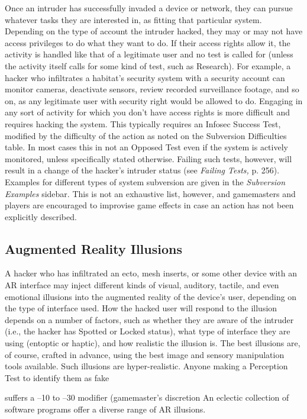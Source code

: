 Once an intruder has successfully invaded a device or network, they can pursue whatever tasks they are interested in, as fitting that particular system. Depending on the type of account the intruder hacked, they may or may not have access privileges to do what they want to do. If their access rights allow it, the activity is handled like that of a legitimate user and no test is called for (unless the activity itself calls for some kind of test, such as Research). For example, a hacker who infiltrates a habitat's security system with a security account can monitor cameras, deactivate sensors, review recorded surveillance footage, and so on, as any legitimate user with security right would be allowed to do. Engaging in any sort of activity for which you don't have access rights is more difficult and requires hacking the system. This typically requires an Infosec Success Test, modified by the difficulty of the action as noted on the Subversion Difficulties table. In most cases this in not an Opposed Test even if the system is actively monitored, unless specifically stated otherwise. Failing such tests, however, will result in a change of the hacker's intruder status (see \textit{Failing Tests,} p. 256). Examples for different types of system subversion are given in the \textit{Subversion Examples} sidebar. This is not an exhaustive list, however, and gamemasters and players are encouraged to improvise game effects in case an action has not been explicitly described. 

\subsection{Augmented Reality Illusions} 

A hacker who has infiltrated an ecto, mesh inserts, or some other device with an AR interface may inject different kinds of visual, auditory, tactile, and even emotional illusions into the augmented reality of the device's user, depending on the type of interface used. How the hacked user will respond to the illusion depends on a number of factors, such as whether they are aware of the intruder (i.e., the hacker has Spotted or Locked status), what type of interface they are using (entoptic or haptic), and how realistic the illusion is. The best illusions are, of course, crafted in advance, using the best image and sensory manipulation tools available. Such illusions are hyper-realistic. Anyone making a Perception Test to identify them as fake 

suffers a –10 to –30 modifier (gamemaster's discretion An eclectic collection of software programs offer a diverse range of AR illusions. 


